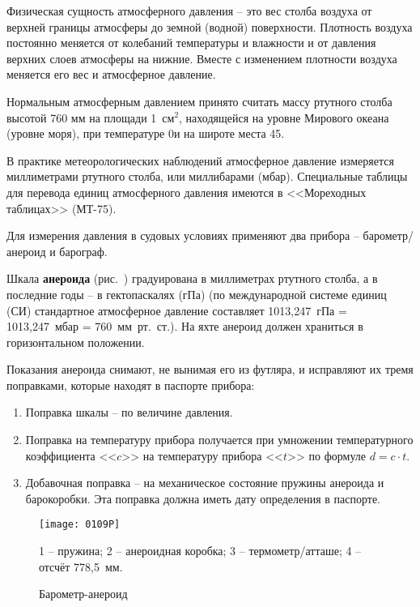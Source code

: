 Физическая сущность атмосферного давления \--- это вес столба воздуха
от верхней границы атмосферы до земной (водной) поверхности. Плотность
воздуха постоянно меняется от колебаний температуры и влажности и от
давления верхних слоев атмосферы на нижние. Вместе с изменением
плотности воздуха меняется его вес и атмосферное давление.

Нормальным атмосферным давлением принято считать массу ртутного столба
высотой 760 мм на площади 1~см$^2$, находящейся на уровне Мирового
океана (уровне моря), при температуре 0\grC и на широте места 45\gr.

В практике метеорологических наблюдений атмосферное давление
измеряется миллиметрами ртутного столба, или миллибарами
(мбар). Специальные таблицы для перевода единиц атмосферного давления
имеются в <<Мореходных таблицах>> (МТ-75).

Для измерения давления в судовых условиях применяют два прибора \---
барометр\-/анероид и барограф.

Шкала \textbf{анероида} (рис.~)
градуирована в миллиметрах ртутного столба, а в последние годы \--- в
гектопаскалях (гПа) (по международной системе единиц (СИ) стандартное
атмосферное давление составляет 1013,247~гПа = 1013,247~мбар =
760~мм~рт.~ст.). На яхте анероид должен храниться в горизонтальном
положении.

Показания анероида снимают, не вынимая его из футляра, и исправляют их
тремя поправками, которые находят в паспорте прибора:

\begin{enumerate}
\item Поправка шкалы \--- по величине давления. 
\item Поправка на температуру прибора получается при умножении
  температурного коэффициента <<$c$>> на температуру прибора <<$t$>>
  по формуле $d = c \cdot t$.
\item Добавочная поправка \--- на механическое состояние пружины
  анероида и барокоробки. Эта поправка должна иметь дату определения в
  паспорте.
\end{enumerate}

\begin{figure}[!htb]
  \centering{}
  \texttt{[image: 0109P]}
  \caption{Барометр-анероид}
  \label{fig:109}
  \small
  \centering{}
  1 \--- пружина; 2 \--- анероидная коробка; 3 \--- термометр\-/атташе; 4 \--- отсчёт 778,5~мм. 
\end{figure}

